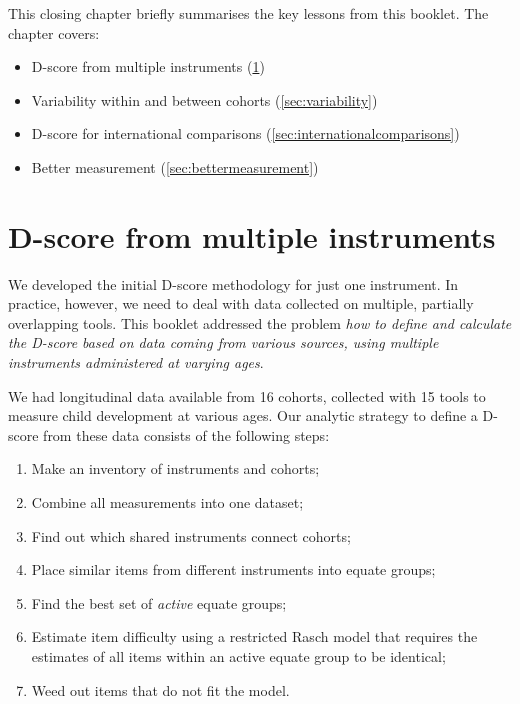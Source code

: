 \documentclass[
]{book}
\providecommand{\tightlist}{%
  \setlength{\itemsep}{0pt}\setlength{\parskip}{0pt}}
\begin{document}
This closing chapter briefly summarises the key lessons from this booklet. The chapter covers:

\begin{itemize}
\tightlist
\item
  D-score from multiple instruments (\ref{sec:multipleinstruments})
\item
  Variability within and between cohorts (\ref{sec:variability})
\item
  D-score for international comparisons (\ref{sec:internationalcomparisons})
\item
  Better measurement (\ref{sec:bettermeasurement})
\end{itemize}

\hypertarget{sec:multipleinstruments}{%
\section{D-score from multiple instruments}\label{sec:multipleinstruments}}

We developed the initial D-score methodology for just one instrument. In practice, however, we need to deal with data collected on multiple, partially overlapping tools. This booklet addressed the problem \emph{how to define and calculate the D-score based on data coming from various sources, using multiple instruments administered at varying ages}.

We had longitudinal data available from 16 cohorts, collected with 15 tools to measure child development at various ages. Our analytic strategy to define a D-score from these data consists of the following steps:

\begin{enumerate}
\def\labelenumi{\arabic{enumi}.}
\tightlist
\item
  Make an inventory of instruments and cohorts;
\item
  Combine all measurements into one dataset;
\item
  Find out which shared instruments connect cohorts;
\item
  Place similar items from different instruments into equate groups;
\item
  Find the best set of \emph{active} equate groups;
\item
  Estimate item difficulty using a restricted Rasch model that requires the estimates of all items within an active equate group to be identical;
\item
  Weed out items that do not fit the model.
\end{enumerate}
\end{document}
